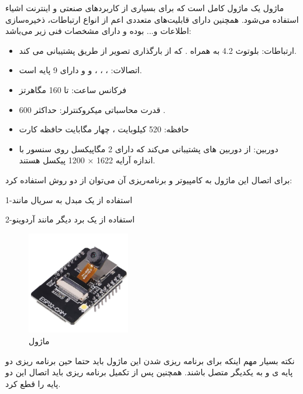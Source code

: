 ماژول
یک ماژول کامل است که برای بسیاری از کاربردهای صنعتی و اینترنت اشیاء استفاده می‌شود. همچنین دارای قابلیت‌های متعددی اعم از انواع ارتباطات، ذخیره‌سازی اطلاعات و... بوده و دارای مشخصات فنی زیر می‌باشد:
\begin{itemize}
	\item 
	ارتباطات: بلوتوث 4.2  به همراه . که از بارگذاری تصویر از طریق  پشتیبانی می کند.
	\item
	اتصالات:  ،  ، ، و  و دارای 9 پایه  است.
	\item
	فرکانس ساعت: تا 160 مگاهرتز
	\item
	قدرت محاسباتی میکروکنترلر: حداکثر 600 .
	\item
	حافظه: 520 کیلوبایت ، چهار مگابایت حافظه کارت 
	\item
	دوربین: از دوربین های  پشتیبانی می‌کند که دارای 2 مگاپیکسل روی سنسور با اندازه آرایه  1622 × 1200 پیکسل هستند.
\end{itemize}



برای اتصال این ماژول به کامپیوتر و برنامه‌ریزی
\noindent\unskip{}
آن می‌توان از دو روش استفاده کرد:

1-استفاده از یک مبدل  به سریال مانند

2-استفاده از یک برد دیگر مانند آردوینو
\noindent\unskip
\noindent\unskip{}


\begin{figure}[H]
	\centering
	\includegraphics[width=0.4\textwidth]{./images/Chapter4/ESP32CAM}
	\caption[ماژول ]{ماژول  \cite{ESP32CAM}}
	\label{ماژول ای اس پی}
\end{figure}

نکته بسیار مهم اینکه برای برنامه ریزی شدن این ماژول باید حتما حین برنامه ریزی دو پایه ی  و به یکدیگر متصل باشند. همچنین پس از تکمیل برنامه ریزی باید اتصال این دو پایه را قطع کرد.\\ 

